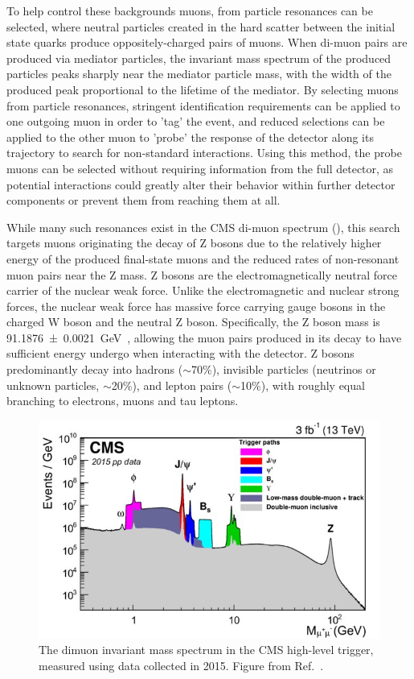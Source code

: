 To help control these backgrounds muons, from particle resonances can be selected, where neutral particles created in the hard scatter between the initial state quarks produce oppositely-charged pairs of muons.
When di-muon pairs are produced via mediator particles, the invariant mass spectrum of the produced particles peaks sharply near the mediator particle mass, with the width of the produced peak proportional to the lifetime of the mediator. 
By selecting muons from particle resonances, stringent identification requirements can be applied to one outgoing muon in order to 'tag' the event, and reduced selections can be applied to the other muon to 'probe' the response of the detector along its trajectory to search for non-standard interactions. 
Using this method, the probe muons can be selected without requiring information from the full detector, as potential \dbrem interactions could greatly alter their behavior within further detector components or prevent them from reaching them at all.

While many such resonances exist in the CMS di-muon spectrum (), this search targets muons originating the decay of Z bosons due to the relatively higher energy of the produced final-state muons and the reduced rates of non-resonant muon pairs near the Z mass.
Z bosons are the electromagnetically neutral force carrier of the nuclear weak force.
Unlike the electromagnetic and nuclear strong forces, the nuclear weak force has massive force carrying gauge bosons in the charged W boson and the neutral Z boson.
Specifically, the Z boson mass is \SI{91.1876\pm0.0021}{\giga\eV}~\cite{pdg}, allowing the muon pairs produced in its decay to have sufficient energy undergo \dbrem when interacting with the detector. 
Z bosons predominantly decay into hadrons ($\sim$70$\%$), invisible particles (neutrinos or unknown particles, $\sim$20$\%$), and lepton pairs ($\sim$10$\%$), with roughly equal branching to electrons, muons and tau leptons.

\begin{figure}[ht]
	\centering
	\includegraphics[width=\textwidth]{figures/cms_diMuonSpectrum.jpg}
	\caption[Inclusive dimuon spectrum in CMS]{The dimuon invariant mass spectrum in the CMS high-level trigger, measured using data collected in 2015. Figure from Ref.~\cite{cmsMuonPerformance}.}
	\label{fig:diMuonSpectrum}
\end{figure}

